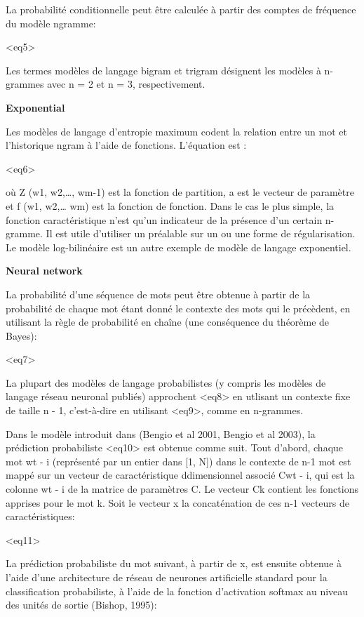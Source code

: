 \documentclass[a4paper, 12pt]{book}
\begin{document}
La probabilité conditionnelle peut être calculée à partir des comptes de fréquence du modèle ngramme:

<eq5>

Les termes modèles de langage bigram et trigram désignent les modèles à n-grammes avec n = 2 et n = 3, respectivement.

\textbf{Exponential}

Les modèles de langage d'entropie maximum codent la relation entre un mot et l'historique ngram à l'aide de fonctions. L'équation est :

<eq6>

où Z (w1, w2,…, wm-1) est la fonction de partition, a est le vecteur de paramètre et f (w1, w2,… wm) est la fonction de fonction. Dans le cas le plus simple, la fonction caractéristique n'est qu'un indicateur de la présence d'un certain n-gramme. Il est utile d’utiliser un préalable sur un ou une forme de régularisation. Le modèle log-bilinéaire est un autre exemple de modèle de langage exponentiel.

\textbf{Neural network}

La probabilité d'une séquence de mots peut être obtenue à partir de la probabilité de chaque mot étant donné le contexte des mots qui le précèdent, en utilisant la règle de probabilité en chaîne (une conséquence du théorème de Bayes):

<eq7>

La plupart des modèles de langage probabilistes (y compris les modèles de langage réseau neuronal publiés) approchent <eq8> en utlisant un contexte fixe de taille n - 1, c'est-à-dire en utilisant <eq9>, comme en n-grammes.

Dans le modèle introduit dans (Bengio et al 2001, Bengio et al 2003), la prédiction probabiliste <eq10> est obtenue comme suit. Tout d'abord, chaque mot wt - i (représenté par un entier dans [1, N]) dans le contexte de n-1 mot est mappé sur un vecteur de caractéristique ddimensionnel associé Cwt - i, qui est la colonne wt - i de la matrice de paramètres C. Le vecteur Ck contient les fonctions apprises pour le mot k. Soit le vecteur x la concaténation de ces n-1 vecteurs de caractéristiques:

<eq11>

La prédiction probabiliste du mot suivant, à partir de x, est ensuite obtenue à l'aide d'une architecture de réseau de neurones artificielle standard pour la classification probabiliste, à l'aide de la fonction d'activation softmax au niveau des unités de sortie (Bishop, 1995):
\end{document}
